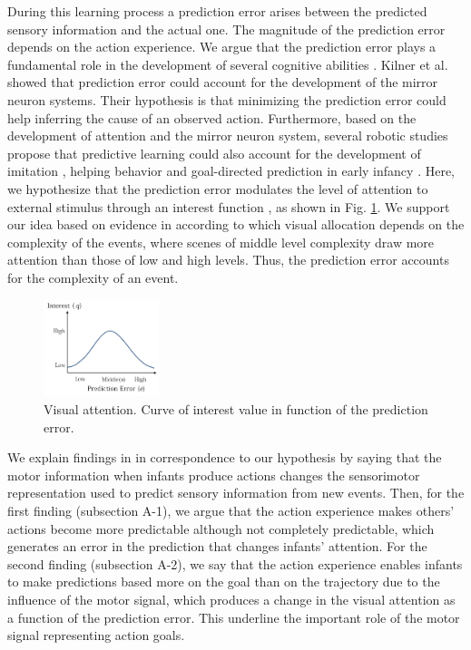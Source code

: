 \documentclass[conference]{IEEEtran}
\begin{document}
During this learning process a prediction error arises between the predicted sensory information and the actual one. The magnitude of the prediction error depends on the action experience. We argue that the prediction error plays a fundamental role in the development of several cognitive abilities \cite{nagai2015}. Kilner et al. \cite{kilner2007predictive} showed that prediction error could account for the development of the mirror neuron systems. Their hypothesis is that minimizing the prediction error could help inferring the cause of an observed action. Furthermore, based on the development of attention and the mirror neuron system, several robotic studies propose that predictive learning could also account for the development of imitation \cite{minato2010model}, helping behavior \cite{baraglia2014prediction} and goal-directed prediction in early infancy \cite{copete2014development}. Here, we hypothesize that the prediction error modulates the level of attention to external stimulus through an interest function  \cite{nagai2015}, as shown in Fig. \ref{Attention}. We support our idea based on evidence in \cite{kidd2012goldilocks} according to which visual allocation depends on the complexity of the events, where scenes of middle level complexity draw more attention than those of low and high levels. Thus, the prediction error accounts for the complexity of an event.

\begin{figure}[!t]
\centering
\includegraphics[width=0.3\textwidth,natwidth=700,natheight=450]{Figure5.png}
\caption{Visual attention. Curve of interest value in function of the prediction error.}
\label{Attention}
\end{figure}

We explain findings in \cite{sommerville2005action} in correspondence to our hypothesis by saying that the motor information when infants produce actions changes the sensorimotor representation used to predict sensory information from new events. Then, for the first finding (subsection A-1), we argue that the action experience makes others' actions become more predictable although not completely predictable, which generates an error in the prediction that changes infants' attention. For the second finding (subsection A-2), we say that the action experience enables infants to make predictions based more on the goal than on the trajectory due to the influence of the motor signal, which produces a change in the visual attention as a function of the prediction error. This underline the important role of the motor signal representing action goals.
\end{document}
